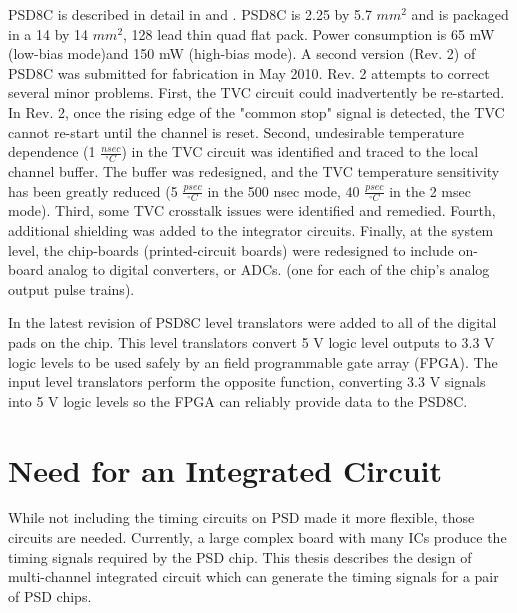 \documentclass[12pt,oneside,final]{siuethesis}
\theoremstyle{definition}
\begin{document}
PSD8C is described in detail in \cite{PROCTOR} and \cite{HALL}. PSD8C is 2.25 by 5.7 $mm^2$ and is packaged in a 14 by 14 $mm^2$, 128 lead thin quad flat pack. Power consumption is 65 mW (low-bias mode)and 150 mW (high-bias mode).
A second version (Rev. 2) of PSD8C was submitted for fabrication in May 2010. Rev. 2 attempts to correct several minor
problems. First, the TVC circuit could inadvertently be re-started. In Rev. 2, once the rising edge of the "common stop" signal is detected, the TVC cannot re-start until the channel is reset. Second, undesirable temperature dependence (1 $\frac{nsec}{^{\circ}C}$) in the TVC circuit was identified and traced to the local channel buffer. The buffer was redesigned, and the TVC temperature sensitivity has been greatly reduced (5 $\frac{psec}{^{\circ}C}$ in the 500 nsec mode, 40 $\frac{psec}{^{\circ}C}$ in the 2 msec mode). Third, some TVC crosstalk issues were identified and remedied. Fourth, additional shielding was added to the integrator circuits. Finally, at the system level, the chip-boards (printed-circuit boards) were redesigned to include on-board analog to digital converters, or ADCs. (one for each of the chip's analog output pulse trains).
\par In the latest revision of PSD8C level translators were added to all of the digital pads on the chip. This level translators convert 5 V logic level outputs to 3.3 V logic levels to be used safely by an field programmable gate array (FPGA). The input level translators perform the opposite function, converting 3.3 V signals into 5 V logic levels so the FPGA can reliably provide data to the PSD8C.

\section{Need for an Integrated Circuit}

While not including the timing circuits on PSD made it more flexible, those circuits are needed.  Currently, a large complex board with many ICs produce the timing signals required by the PSD chip. This thesis describes the design of multi-channel integrated circuit which can generate the timing signals for a pair of PSD chips.
\end{document}
